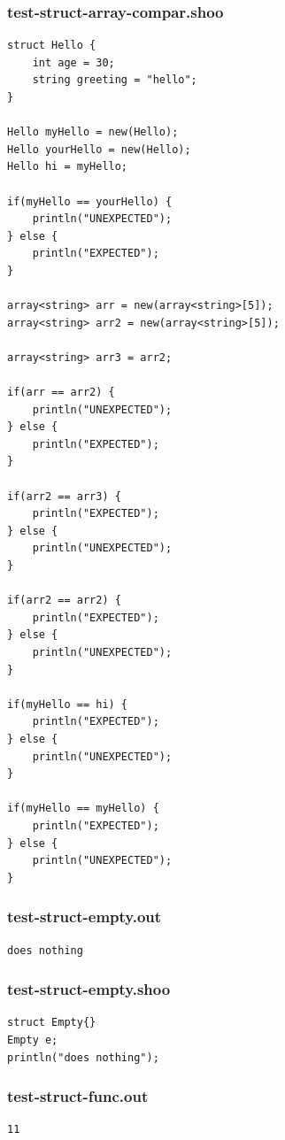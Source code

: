 \documentclass[12pt]{article}
\begin{document}
\subsubsection{test-struct-array-compar.shoo}
\begin{mdframed}[hidealllines=true,backgroundcolor=blue!10]
\begin{lstlisting}
struct Hello {
	int age = 30;
	string greeting = "hello";
}

Hello myHello = new(Hello);
Hello yourHello = new(Hello);
Hello hi = myHello;

if(myHello == yourHello) {
	println("UNEXPECTED");
} else {
	println("EXPECTED");
}

array<string> arr = new(array<string>[5]);
array<string> arr2 = new(array<string>[5]);

array<string> arr3 = arr2;

if(arr == arr2) {
	println("UNEXPECTED");
} else {
	println("EXPECTED");
}

if(arr2 == arr3) {
	println("EXPECTED");
} else {
	println("UNEXPECTED");
}

if(arr2 == arr2) {
	println("EXPECTED");
} else {
	println("UNEXPECTED");
}

if(myHello == hi) {
	println("EXPECTED");
} else {
	println("UNEXPECTED");
}

if(myHello == myHello) {
	println("EXPECTED");
} else {
	println("UNEXPECTED");
}
\end{lstlisting}
\end{mdframed}
\subsubsection{test-struct-empty.out}
\begin{mdframed}[hidealllines=true,backgroundcolor=green!10]
\begin{lstlisting}
does nothing
\end{lstlisting}
\end{mdframed}
\subsubsection{test-struct-empty.shoo}
\begin{mdframed}[hidealllines=true,backgroundcolor=blue!10]
\begin{lstlisting}
struct Empty{}
Empty e;
println("does nothing");
\end{lstlisting}
\end{mdframed}
\subsubsection{test-struct-func.out}
\begin{mdframed}[hidealllines=true,backgroundcolor=green!10]
\begin{lstlisting}
11
\end{lstlisting}
\end{mdframed}
\end{document}
